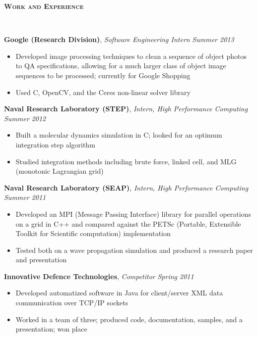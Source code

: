 \documentclass{article}
\newenvironment{changemargin}[2]{%
  \begin{list}{}{%
    \setlength{\topsep}{0pt}%
    \setlength{\leftmargin}{#1}%
    \setlength{\rightmargin}{#2}%
    \setlength{\listparindent}{\parindent}%
    \setlength{\itemindent}{\parindent}%
    \setlength{\parsep}{\parskip}%
  }%
  \item[]}{\end{list}
}
\newcommand{\lineover}{
	\begin{changemargin}{-0.05in}{-0.05in}
		\vspace*{-8pt}
		\hrulefill \\
		\vspace*{-2pt}
	\end{changemargin}
}
\newcommand{\header}[1]{
	\begin{changemargin}{-0.5in}{-0.5in}
		{\large \textbf{\scshape{#1}}}\\
  	\lineover
	\end{changemargin}
}
\newenvironment{body} {
	\vspace*{-16pt}
	\begin{changemargin}{-0.25in}{-0.5in}
  }	
	{\end{changemargin}
}
\newcommand{\CC}{C\nolinebreak\hspace{-.05em}\raisebox{.4ex}{\tiny\bf +}\nolinebreak\hspace{-.10em}\raisebox{.4ex}{\tiny\bf +}}
\begin{document}
\smallskip


\header{Work and Experience}

\begin{body}
	\vspace{14pt}
	\textbf{Google (Research Division)}, \emph{Software Engineering Intern} \hfill \emph{Summer 2013}\\
	\vspace*{-4pt}
	\begin{itemize}
		\item Developed image processing techniques to clean a sequence of object photos to QA specifications, allowing for a much larger class of object image sequences to be processed; currently for Google Shopping
		\item Used \CC, OpenCV, and the Ceres non-linear solver library
	\end{itemize}

	\medskip

	\textbf{Naval Research Laboratory (STEP)}, \emph{Intern, High Performance Computing} \hfill \emph{Summer 2012}\\
	\vspace*{-4pt}
	\begin{itemize}
		\item Built a molecular dynamics simulation in C; looked for an optimum integration step algorithm
		\item Studied integration methods including brute force, linked cell, and MLG (monotonic Lagrangian grid)
	\end{itemize}
	
	\medskip

	\textbf{Naval Research Laboratory (SEAP)}, \emph{Intern, High Performance Computing} \hfill \emph{Summer 2011}\\
	\vspace*{-4pt}
	\begin{itemize}
		\item Developed an MPI (Message Passing Interface) library for parallel operations on a grid in C++ and compared against the PETSc (Portable, Extensible Toolkit for Scientific computation) implementation
		\item Tested both on a wave propagation simulation and produced a research paper and presentation
	\end{itemize}	
	
	\medskip
	
	\textbf{Innovative Defence Technologies}, \emph{Competitor} \hfill \emph{Spring 2011}\\
	\vspace*{-4pt}
	\begin{itemize}
		\item Developed automatized software in Java for client/server XML data communication over TCP/IP sockets
		\item Worked in a team of three; produced code, documentation, samples, and a presentation; won  place
	\end{itemize}
\end{body}
\end{document}
